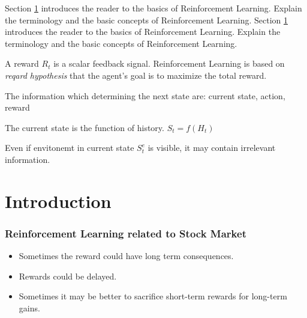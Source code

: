 Section \ref{sec:rl-introduction} introduces the reader to the basics of Reinforcement Learning.
Explain the terminology and the basic concepts of Reinforcement Learning.
Section \ref{sec:rl-introduction} introduces the reader to the basics of Reinforcement Learning.
Explain the terminology and the basic concepts of Reinforcement Learning.

A reward $R_t$ is a scalar feedback signal.
Reinforcement Learning is based on \textit{reqard hypothesis} that the agent's goal is to maximize the total reward.

The information which determining the next state are: current state, action, reward

The current state is the function of history.
$S_t = f(H_t)$

Even if envitonemt in current state $S_{t}^{e}$ is visible, it may contain irrelevant information.


\section{Introduction}\label{sec:rl-introduction}

\subsubsection{Reinforcement Learning related to Stock Market}\label{subsec:rl-introduction}
\begin{itemize}
    \item Sometimes the reward could have long term consequences.
    \item Rewards could be delayed.
    \item Sometimes it may be better to sacrifice short-term rewards for long-term gains.
\end{itemize}

